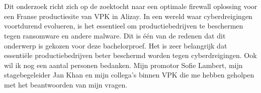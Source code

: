 
\chapter*{}%
\label{ch:voorwoord}

Dit onderzoek richt zich op de zoektocht naar een optimale firewall oplossing voor een Franse productiesite van VPK in Alizay. In een wereld waar cyberdreigingen voortdurend evolueren, is het essentieel om productiebedrijven te beschermen tegen ransomware en andere malware. Dit is één van de redenen dat dit onderwerp is gekozen voor deze bachelorproef. Het is zeer belangrijk dat essentiële productiebedrijven beter beschermd worden tegen cyberdreigingen.
Ook wil ik nog een aantal personen bedanken. Mijn promotor Sofie Lambert, mijn stagebegeleider Jan Khan en mijn collega's binnen VPK die me hebben geholpen met het beantwoorden van mijn vragen.